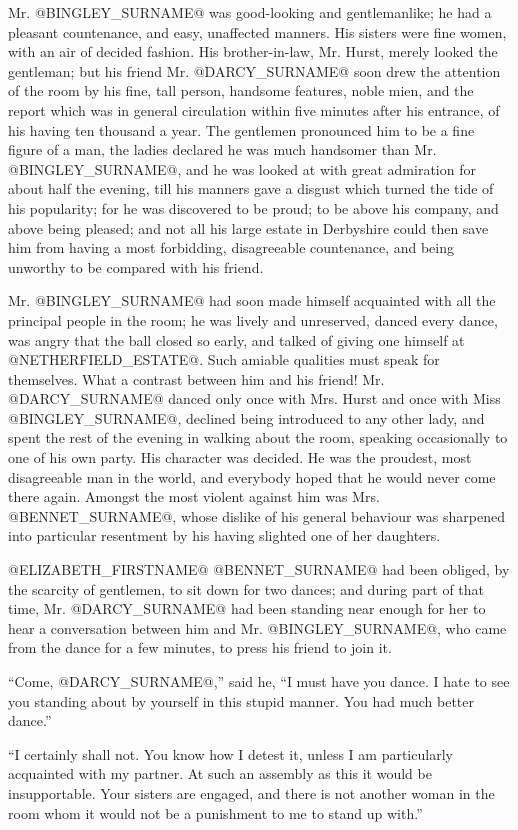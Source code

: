 Mr. @BINGLEY_SURNAME@ was good-looking and gentlemanlike; he had a pleasant
countenance, and easy, unaffected manners. His sisters were fine women,
with an air of decided fashion. His brother-in-law, Mr. Hurst, merely
looked the gentleman; but his friend Mr. @DARCY_SURNAME@ soon drew the attention
of the room by his fine, tall person, handsome features, noble mien, and
the report which was in general circulation within five minutes
after his entrance, of his having ten thousand a year. The gentlemen
pronounced him to be a fine figure of a man, the ladies declared he
was much handsomer than Mr. @BINGLEY_SURNAME@, and he was looked at with great
admiration for about half the evening, till his manners gave a disgust
which turned the tide of his popularity; for he was discovered to be
proud; to be above his company, and above being pleased; and not all
his large estate in Derbyshire could then save him from having a most
forbidding, disagreeable countenance, and being unworthy to be compared
with his friend.

Mr. @BINGLEY_SURNAME@ had soon made himself acquainted with all the principal
people in the room; he was lively and unreserved, danced every dance,
was angry that the ball closed so early, and talked of giving
one himself at @NETHERFIELD_ESTATE@. Such amiable qualities must speak for
themselves. What a contrast between him and his friend! Mr. @DARCY_SURNAME@ danced
only once with Mrs. Hurst and once with Miss @BINGLEY_SURNAME@, declined being
introduced to any other lady, and spent the rest of the evening in
walking about the room, speaking occasionally to one of his own party.
His character was decided. He was the proudest, most disagreeable man
in the world, and everybody hoped that he would never come there again.
Amongst the most violent against him was Mrs. @BENNET_SURNAME@, whose dislike of
his general behaviour was sharpened into particular resentment by his
having slighted one of her daughters.

@ELIZABETH_FIRSTNAME@ @BENNET_SURNAME@ had been obliged, by the scarcity of gentlemen, to sit
down for two dances; and during part of that time, Mr. @DARCY_SURNAME@ had been
standing near enough for her to hear a conversation between him and Mr.
@BINGLEY_SURNAME@, who came from the dance for a few minutes, to press his friend
to join it.

``Come, @DARCY_SURNAME@,'' said he, ``I must have you dance. I hate to see you
standing about by yourself in this stupid manner. You had much better
dance.''

``I certainly shall not. You know how I detest it, unless I am
particularly acquainted with my partner. At such an assembly as this
it would be insupportable. Your sisters are engaged, and there is not
another woman in the room whom it would not be a punishment to me to
stand up with.''

